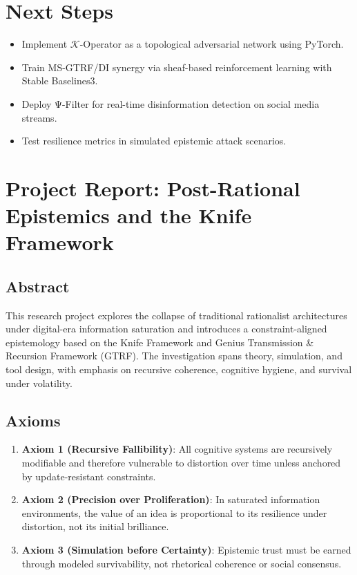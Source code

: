 \documentclass[12pt]{article}
\begin{document}
\section{Next Steps}
\begin{itemize}
    \item Implement $\mathcal{K}$-Operator as a topological adversarial network using PyTorch.
    \item Train MS-GTRF/DI synergy via sheaf-based reinforcement learning with Stable Baselines3.
    \item Deploy Ψ-Filter for real-time disinformation detection on social media streams.
    \item Test resilience metrics in simulated epistemic attack scenarios.
\end{itemize}

\section{Project Report: Post-Rational Epistemics and the Knife Framework}

\subsection{Abstract}
This research project explores the collapse of traditional rationalist architectures under digital-era information saturation and introduces a constraint-aligned epistemology based on the Knife Framework and Genius Transmission \& Recursion Framework (GTRF). The investigation spans theory, simulation, and tool design, with emphasis on recursive coherence, cognitive hygiene, and survival under volatility.

\subsection{Axioms}
\begin{enumerate}
    \item \textbf{Axiom 1 (Recursive Fallibility)}: All cognitive systems are recursively modifiable and therefore vulnerable to distortion over time unless anchored by update-resistant constraints.
    \item \textbf{Axiom 2 (Precision over Proliferation)}: In saturated information environments, the value of an idea is proportional to its resilience under distortion, not its initial brilliance.
    \item \textbf{Axiom 3 (Simulation before Certainty)}: Epistemic trust must be earned through modeled survivability, not rhetorical coherence or social consensus.
\end{enumerate}
\end{document}
